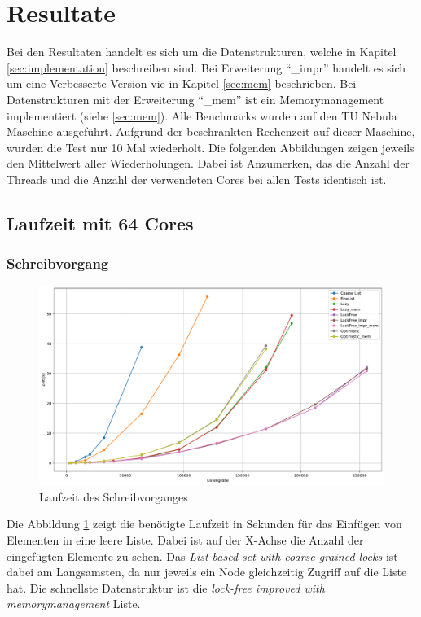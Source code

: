 \section{Resultate}
Bei den Resultaten handelt es sich um die Datenstrukturen, welche in Kapitel \ref{sec:implementation} beschreiben sind.
Bei Erweiterung ``\_impr'' handelt es sich um eine Verbesserte Version vie in Kapitel \ref{sec:mem} beschrieben.
Bei Datenstrukturen mit der Erweiterung ``\_mem'' ist ein Memorymanagement implementiert (siehe \ref{sec:mem}).
Alle Benchmarks wurden auf den TU Nebula Maschine ausgeführt. Aufgrund der beschrankten Rechenzeit auf dieser Maschine,
wurden die Test nur 10 Mal wiederholt. Die folgenden Abbildungen zeigen jeweils den Mittelwert aller Wiederholungen.
Dabei ist Anzumerken, das die Anzahl der Threads und die Anzahl der verwendeten Cores bei allen Tests identisch ist. 

\subsection{Laufzeit mit 64 Cores}

\subsubsection{Schreibvorgang}
\begin{figure}[ht!]
	\centering
	\includegraphics[width=1.0\linewidth]{./plots_pdf/write_time} 
	\caption{Laufzeit des Schreibvorganges}
	\label{fig:write_time} 
\end{figure}
Die Abbildung \ref{fig:write_time} zeigt die benötigte Laufzeit in Sekunden für das Einfügen von Elementen in eine leere Liste.
Dabei ist auf der X-Achse die Anzahl der eingefügten Elemente zu sehen. 
Das \textit{List-based set with coarse-grained locks} ist dabei am Langsamsten, da nur jeweils ein Node gleichzeitig 
Zugriff auf die Liste hat. Die schnellste Datenstruktur ist die \textit{lock-free improved with memorymanagement} Liste.

